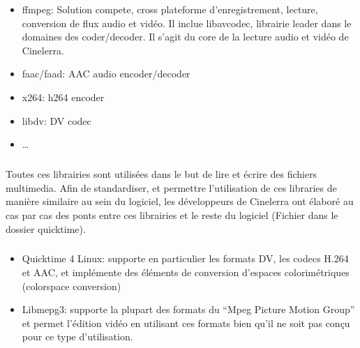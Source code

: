 \begin{itemize}

  \item{ffmpeg: Solution compete, cross plateforme
  d'enregistrement, lecture, conversion de flux audio et vidéo. Il
  inclue libavcodec, librairie leader dans le domaines des
  coder/decoder.
Il s'agit du core de la
  lecture audio et vidéo de Cinelerra.}

  \item{faac/faad: AAC audio encoder/decoder}

  \item{x264: h264 encoder}

  \item{libdv: DV codec}

  \item{\ldots}

\end{itemize}

\subparagraph{}

Toutes ces librairies sont utilisées dans le but de lire et écrire des
fichiers multimedia. Afin de standardiser, et permettre l'utilisation de
ces libraries de manière similaire au sein du logiciel, les développeurs
de Cinelerra ont élaboré au cas par cas des ponts entre ces librairies
et le reste du logiciel (Fichier dans le dossier quicktime).

\subparagraph{}

\begin{itemize}

  \item {Quicktime 4 Linux: supporte en particulier les formats DV,
    les codecs H.264 et AAC, et implémente des éléments de conversion
    d'espaces colorimétriques (colorspace conversion)}

  \item {Libmepg3: supporte la plupart des formats du ``Mpeg Picture
    Motion Group''  et permet l'édition
    vidéo en utilisant ces formats bien qu'il ne soit pas conçu pour
    ce type d'utilisation.}

\end{itemize}

